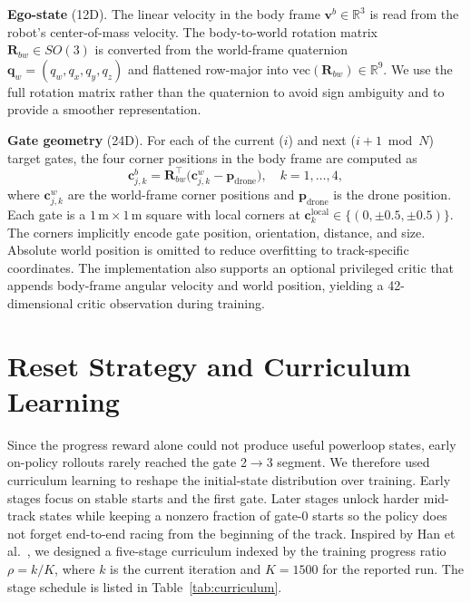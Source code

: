 \documentclass[conference]{IEEEtran}
\begin{document}
\textbf{Ego-state} (12D). The linear velocity in the body frame $\mathbf{v}^b \in \mathbb{R}^3$ is read from the robot's center-of-mass velocity. The body-to-world rotation matrix $\mathbf{R}_{bw} \in SO(3)$ is converted from the world-frame quaternion $\mathbf{q}_w = (q_w, q_x, q_y, q_z)$ and flattened row-major into $\text{vec}(\mathbf{R}_{bw}) \in \mathbb{R}^9$. We use the full rotation matrix rather than the quaternion to avoid sign ambiguity and to provide a smoother representation.

\textbf{Gate geometry} (24D). For each of the current ($i$) and next ($i{+}1 \bmod N$) target gates, the four corner positions in the body frame are computed as
\begin{equation}\label{eq:corners}
  \mathbf{c}^b_{j,k} = \mathbf{R}_{bw}^\top \bigl(\mathbf{c}^w_{j,k} - \mathbf{p}_{\text{drone}}\bigr), \quad k=1,\dots,4,
\end{equation}
where $\mathbf{c}^w_{j,k}$ are the world-frame corner positions and $\mathbf{p}_{\text{drone}}$ is the drone position. Each gate is a $1\,\text{m}\times 1\,\text{m}$ square with local corners at $\mathbf{c}_k^{\text{local}} \in \{(0, \pm 0.5, \pm 0.5)\}$. The corners implicitly encode gate position, orientation, distance, and size. Absolute world position is omitted to reduce overfitting to track-specific coordinates. The implementation also supports an optional privileged critic that appends body-frame angular velocity and world position, yielding a 42-dimensional critic observation during training.

\section{Reset Strategy and Curriculum Learning}

Since the progress reward alone could not produce useful powerloop states, early on-policy rollouts rarely reached the gate 2$\rightarrow$3 segment. We therefore used curriculum learning to reshape the initial-state distribution over training. Early stages focus on stable starts and the first gate. Later stages unlock harder mid-track states while keeping a nonzero fraction of gate-0 starts so the policy does not forget end-to-end racing from the beginning of the track. Inspired by Han et al.~\cite{han2025reactive}, we designed a five-stage curriculum indexed by the training progress ratio $\rho = k / K$, where $k$ is the current iteration and $K=1500$ for the reported run. The stage schedule is listed in Table~\ref{tab:curriculum}.
\end{document}
